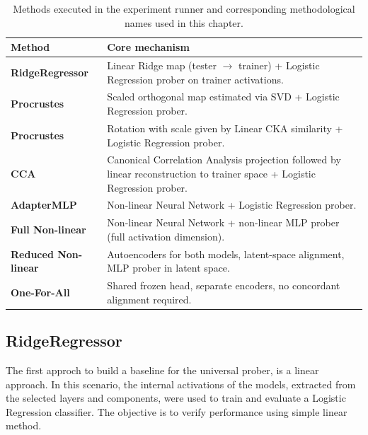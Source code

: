 \begin{table}[t]
\centering
\begin{tabularx}{\textwidth}{lX}
    \toprule
    \textbf{Method} & \textbf{Core mechanism} \\
    \midrule
    \textbf{RidgeRegressor} & Linear Ridge map (tester $\rightarrow$ trainer) + Logistic Regression prober on trainer activations. \\
    \textbf{Procrustes} & Scaled orthogonal map estimated via SVD + Logistic Regression prober. \\
    \textbf{Procrustes} & Rotation with scale given by Linear CKA similarity + Logistic Regression prober. \\
    \textbf{CCA} & Canonical Correlation Analysis projection followed by linear reconstruction to trainer space + Logistic Regression prober. \\
    \textbf{AdapterMLP} & Non-linear Neural Network + Logistic Regression prober. \\
    \textbf{Full Non-linear} & Non-linear Neural Network + non-linear MLP prober (full activation dimension). \\
    \textbf{Reduced Non-linear} & Autoencoders for both models, latent-space alignment, MLP prober in latent space. \\
    \textbf{One-For-All} & Shared frozen head, separate encoders, no concordant alignment required. \\
    \bottomrule
\end{tabularx}
\caption{Methods executed in the experiment runner and corresponding methodological names used in this chapter.}
\label{tab:method-mapping-runner}
\end{table}

\subsection{RidgeRegressor}
The first approch to build a baseline for the universal prober, is a linear approach. In this scenario, the internal activations of the models, extracted from the selected layers and components, were used to train and evaluate a Logistic Regression classifier. The objective is to verify performance using simple linear method.

